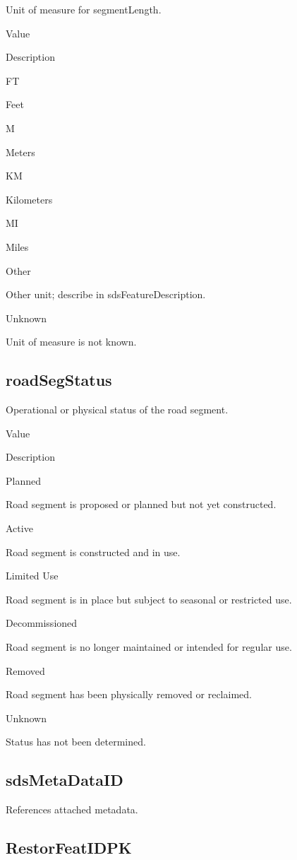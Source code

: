 \documentclass[
  letterpaper,
  DIV=11,
  numbers=noendperiod]{scrreprt}
\begin{document}
Unit of measure for segmentLength.

Value

Description

FT

Feet

M

Meters

KM

Kilometers

MI

Miles

Other

Other unit; describe in sdsFeatureDescription.

Unknown

Unit of measure is not known.

\subsection{roadSegStatus}\label{roadsegstatus}

Operational or physical status of the road segment.

Value

Description

Planned

Road segment is proposed or planned but not yet constructed.

Active

Road segment is constructed and in use.

Limited Use

Road segment is in place but subject to seasonal or restricted use.

Decommissioned

Road segment is no longer maintained or intended for regular use.

Removed

Road segment has been physically removed or reclaimed.

Unknown

Status has not been determined.

\subsection{sdsMetaDataID}\label{sdsmetadataid-23}

References attached metadata.

\subsection{RestorFeatIDPK}\label{restorfeatidpk-23}
\end{document}
